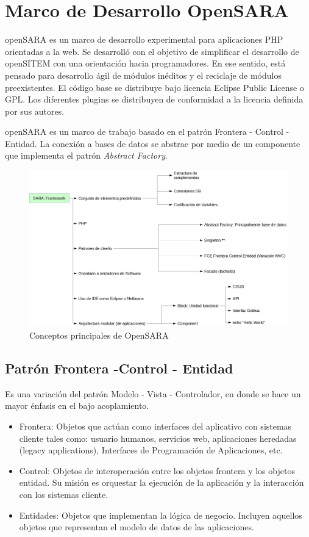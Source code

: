\section{Marco de Desarrollo OpenSARA}

openSARA es un marco de desarrollo experimental para aplicaciones PHP orientadas a la web. Se desarrolló con el objetivo de simplificar el desarrollo de openSITEM con una orientación hacia programadores. En ese sentido, está pensado para desarrollo ágil de módulos inéditos y el reciclaje de módulos preexistentes. El código base se distribuye bajo licencia Eclipse Public License o GPL. Los diferentes plugins se distribuyen de conformidad a la licencia definida por sus autores. 

openSARA es un marco de trabajo basado en el patrón Frontera - Control - Entidad. La conexión a bases de datos se abstrae por medio de un componente que implementa el patrón \textit{Abstract Factory}. 

\begin{figure}
 \centering
 \includegraphics[width=156mm]{openSARA.png}
 \caption{Conceptos principales de OpenSARA}
 \label{aplicaciones_sitem}
\end{figure}


\subsection{Patrón Frontera -Control - Entidad}

Es una variación del patrón Modelo - Vista - Controlador, en donde se hace un mayor énfasis en el bajo acoplamiento. 

\begin{itemize}
 \item Frontera: Objetos que actúan como interfaces del aplicativo con sistemas cliente tales como: usuario humanos, servicios web, aplicaciones heredadas (legacy applications), Interfaces de Programación de Aplicaciones, etc.
 \item Control: Objetos de interoperación entre los objetos frontera y los objetos entidad. Su misión es orquestar la ejecución de la aplicación y la interacción con los sistemas cliente.
 \item Entidades: Objetos que implementan la lógica de negocio. Incluyen aquellos objetos que representan el modelo de datos de las aplicaciones.
\end{itemize}


